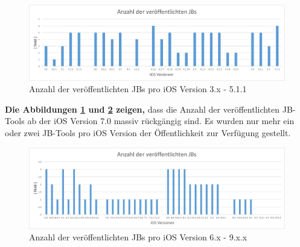 \begin{figure}[hp!]
        \centering
                \includegraphics[scale=0.5]{Bilder/iOSJB1.png}
        \caption{Anzahl der veröffentlichten JBs pro iOS Version 3.x - 5.1.1}
        \label{fig:AnalyseAnzahliOSJB1}
\end{figure}

\textbf{Die Abbildungen \ref{fig:AnalyseAnzahliOSJB1} und \ref{fig:AnalyseAnzahliOSJB2} zeigen,} dass die Anzahl der veröffentlichten JB-Tools ab der iOS Version 7.0 massiv rückgängig sind. Es wurden nur mehr ein oder zwei JB-Tools pro iOS Version der Öffentlichkeit zur Verfügung gestellt. 

\begin{figure}[hp!]
        \centering
                \includegraphics[scale=0.5]{Bilder/iOSJB2.png}
        \caption{Anzahl der veröffentlichten JBs pro iOS Version 6.x - 9.x.x}
        \label{fig:AnalyseAnzahliOSJB2}
\end{figure}


